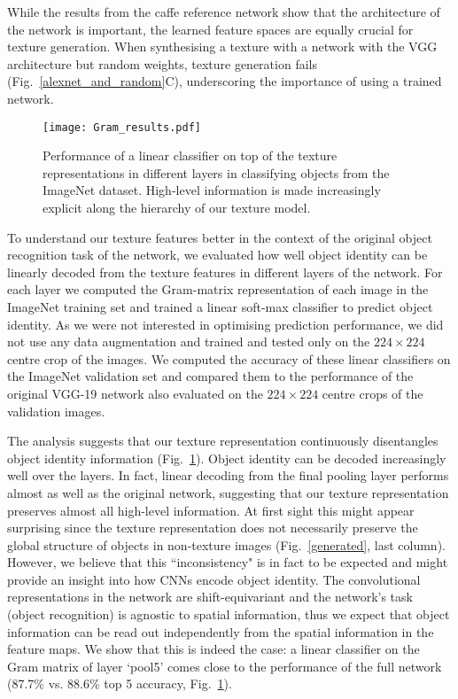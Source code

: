 \documentclass{article} %
\begin{document}
While the results from the caffe reference network show that the architecture of the network is important, the learned feature spaces are equally crucial for texture generation. When synthesising a texture with a network with the VGG architecture but random weights, texture generation fails (Fig.~\ref{alexnet_and_random}C), underscoring the importance of using a trained network.

\begin{figure}[]
\begin{center}
\texttt{[image: Gram\_results.pdf]}%
\end{center}
\caption{\label{gram_results} Performance of a linear classifier on top of the texture representations in different layers in classifying objects from the ImageNet dataset. High-level information is made increasingly explicit along the hierarchy of our texture model. }
\end{figure}

To understand our texture features better in the context of the original object recognition task of the network, we evaluated how well object identity can be linearly decoded from the texture features in different layers of the network. For each layer we computed the Gram-matrix representation of each image in the ImageNet training set \cite{russakovsky_imagenet_2014} and trained a linear soft-max classifier to predict object identity. As we were not interested in optimising prediction performance, we did not use any data augmentation and trained and tested only on the $224 \times 224$ centre crop of the images. We computed the accuracy of these linear classifiers on the ImageNet validation set and compared them to the performance of the original VGG-19 network also evaluated on the $224 \times 224$ centre crops of the validation images.

The analysis suggests that our texture representation continuously disentangles object identity information (Fig.~\ref{gram_results}). Object identity can be decoded increasingly well over the layers. In fact, linear decoding from the final pooling layer performs almost as well as the original network, suggesting that our texture representation preserves almost all high-level information. At first sight this might appear surprising since the texture representation does not necessarily preserve the global structure of objects in non-texture images (Fig.~\ref{generated}, last column). However, we believe that this ``inconsistency" is in fact to be expected and might provide an insight into how CNNs encode object identity. The convolutional representations in the network are shift-equivariant and the network's task (object recognition) is agnostic to spatial information, thus we expect that object information can be read out independently from the spatial information in the feature maps. We show that this is indeed the case: a linear classifier on the Gram matrix of layer `pool5' comes close to the performance of the full network (87.7\% vs. 88.6\% top 5 accuracy, Fig.~\ref{gram_results}). 
\end{document}
